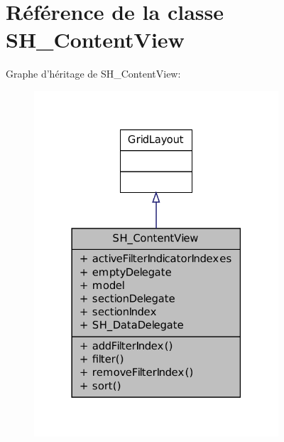 \hypertarget{classSH__ContentView}{\section{Référence de la classe S\-H\-\_\-\-Content\-View}
\label{classSH__ContentView}
}


Graphe d'héritage de S\-H\-\_\-\-Content\-View\-:\nopagebreak
\begin{figure}[H]
\begin{center}
\leavevmode
\includegraphics[width=258pt]{classSH__ContentView__inherit__graph}
\end{center}
\end{figure}


